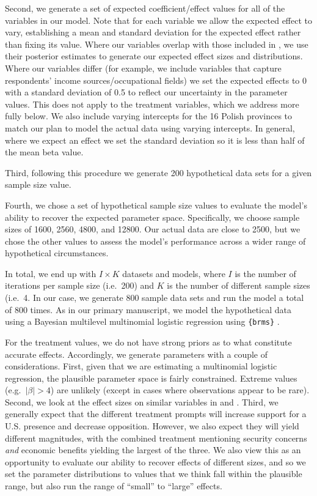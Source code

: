 \documentclass[
  10,
  letterpaper,
  DIV=11,
  numbers=noendperiod]{scrartcl}
\begin{document}
Second, we generate a set of expected coefficient/effect values for all
of the variables in our model. Note that for each variable we allow the
expected effect to vary, establishing a mean and standard deviation for
the expected effect rather than fixing its value. Where our variables
overlap with those included in \citet{Allenetal2022}, we use their
posterior estimates to generate our expected effect sizes and
distributions. Where our variables differ (for example, we include
variables that capture respondents' income sources/occupational fields)
we set the expected effects to 0 with a standard deviation of 0.5 to
reflect our uncertainty in the parameter values. This does not apply to
the treatment variables, which we address more fully below. We also
include varying intercepts for the 16 Polish provinces to match our plan
to model the actual data using varying intercepts. In general, where we
expect an effect we set the standard deviation so it is less than half
of the mean beta value.

Third, following this procedure we generate 200 hypothetical data sets
for a given sample size value.

Fourth, we chose a set of hypothetical sample size values to evaluate
the model's ability to recover the expected parameter space.
Specifically, we choose sample sizes of 1600, 2560, 4800, and 12800. Our
actual data are close to 2500, but we chose the other values to assess
the model's performance across a wider range of hypothetical
circumstances.

In total, we end up with \(I \times K\) datasets and models, where \(I\)
is the number of iterations per sample size (i.e.~200) and \(K\) is the
number of different sample sizes (i.e.~4. In our case, we generate 800
sample data sets and run the model a total of 800 times. As in our
primary manuscript, we model the hypothetical data using a Bayesian
multilevel multinomial logistic regression using \texttt{\{brms\}}
\citep{Burkner2017, Burkner2018}.

For the treatment values, we do not have strong priors as to what
constitute accurate effects. Accordingly, we generate parameters with a
couple of considerations. First, given that we are estimating a
multinomial logistic regression, the plausible parameter space is fairly
constrained. Extreme values (e.g.~\(|\beta| > 4\)) are unlikely (except
in cases where observations appear to be rare). Second, we look at the
effect sizes on similar variables in \citet{Allenetal2020} and
\citet{Allenetal2022}. Third, we generally expect that the different
treatment prompts will increase support for a U.S. presence and decrease
opposition. However, we also expect they will yield different
magnitudes, with the combined treatment mentioning security concerns
\emph{and} economic benefits yielding the largest of the three. We also
view this as an opportunity to evaluate our ability to recover effects
of different sizes, and so we set the parameter distributions to values
that we think fall within the plausible range, but also run the range of
``small'' to ``large'' effects.
\end{document}
